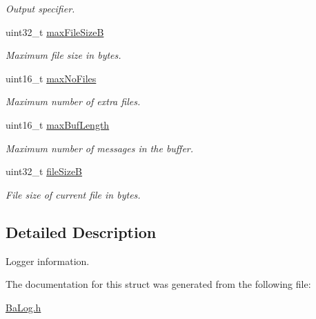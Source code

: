 \begin{DoxyCompactItemize}
\begin{DoxyCompactList}\small\item\em Output specifier. \end{DoxyCompactList}\item 
\hypertarget{structTBaLogInfo_aa3bf9b90409a8e9e83696ab940efd522}{}uint32\+\_\+t \hyperlink{structTBaLogInfo_aa3bf9b90409a8e9e83696ab940efd522}{max\+File\+Size\+B}\label{structTBaLogInfo_aa3bf9b90409a8e9e83696ab940efd522}

\begin{DoxyCompactList}\small\item\em Maximum file size in bytes. \end{DoxyCompactList}\item 
\hypertarget{structTBaLogInfo_adbd1ecdf038ce3e82990c26e3f9810e2}{}uint16\+\_\+t \hyperlink{structTBaLogInfo_adbd1ecdf038ce3e82990c26e3f9810e2}{max\+No\+Files}\label{structTBaLogInfo_adbd1ecdf038ce3e82990c26e3f9810e2}

\begin{DoxyCompactList}\small\item\em Maximum number of extra files. \end{DoxyCompactList}\item 
\hypertarget{structTBaLogInfo_adc7f0a818941399d8b8e69aa005863ae}{}uint16\+\_\+t \hyperlink{structTBaLogInfo_adc7f0a818941399d8b8e69aa005863ae}{max\+Buf\+Length}\label{structTBaLogInfo_adc7f0a818941399d8b8e69aa005863ae}

\begin{DoxyCompactList}\small\item\em Maximum number of messages in the buffer. \end{DoxyCompactList}\item 
\hypertarget{structTBaLogInfo_a16fdaba7033102060e6ceb3c4d8d70b6}{}uint32\+\_\+t \hyperlink{structTBaLogInfo_a16fdaba7033102060e6ceb3c4d8d70b6}{file\+Size\+B}\label{structTBaLogInfo_a16fdaba7033102060e6ceb3c4d8d70b6}

\begin{DoxyCompactList}\small\item\em File size of current file in bytes. \end{DoxyCompactList}\end{DoxyCompactItemize}


\subsection{Detailed Description}
Logger information. 

The documentation for this struct was generated from the following file\+:\begin{DoxyCompactItemize}
\item 
\hyperlink{BaLog_8h}{Ba\+Log.\+h}\end{DoxyCompactItemize}
